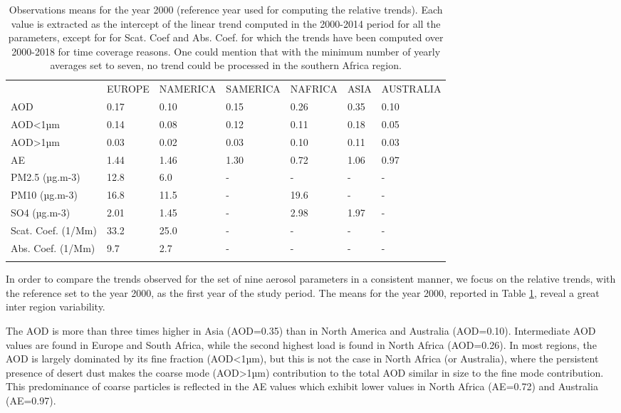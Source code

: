 \documentclass[journal abbreviation, manuscript]{copernicus}
\begin{document}
\begin{table}
 \begin{tabular}{lllllll}
  \tophline
                     & EUROPE & NAMERICA & SAMERICA & NAFRICA & ASIA & AUSTRALIA \\
  \middlehline
  AOD                & 0.17   & 0.10     & 0.15     & 0.26    & 0.35 & 0.10      \\
  AOD<1µm            & 0.14   & 0.08     & 0.12     & 0.11    & 0.18 & 0.05      \\
  AOD>1µm            & 0.03   & 0.02     & 0.03     & 0.10    & 0.11 & 0.03      \\
  AE                 & 1.44   & 1.46     & 1.30     & 0.72    & 1.06 & 0.97      \\
  PM2.5 (µg.m-3)     & 12.8   & 6.0      & -        & -       & -    & -         \\
  PM10 (µg.m-3)      & 16.8   & 11.5     & -        & 19.6    & -    & -         \\
  SO4 (µg.m-3)       & 2.01   & 1.45     & -        & 2.98    & 1.97 & -         \\
  Scat. Coef. (1/Mm) & 33.2   & 25.0     & -        & -       & -    & -         \\
  Abs. Coef. (1/Mm)  & 9.7    & 2.7      & -        & -       & -    & -         \\
  \bottomhline
 \end{tabular}

 \caption{Observations means for the year 2000 (reference year used for computing the relative trends). Each value is extracted as the intercept of the linear trend computed in the 2000-2014 period for all the parameters, except for for Scat. Coef and Abs. Coef. for which the trends have been computed over 2000-2018 for time coverage reasons. One could mention that with the minimum number of yearly averages set to seven, no trend could be processed in the southern Africa region.}
 \label{table:obs_2000mean}
\end{table}

In order to compare the trends observed for the set of nine aerosol parameters in a consistent manner, we focus on the relative trends, with the reference set to the year 2000, as the first year of the study period. The means for the year 2000, reported in Table \ref{table:obs_2000mean}, reveal a great inter region variability.

The AOD is more than three times higher in Asia (AOD=0.35) than in North America and Australia (AOD=0.10). Intermediate AOD values are found in Europe and South Africa, while the second highest load is found in North Africa (AOD=0.26). In most regions, the AOD is largely dominated by its fine fraction (AOD<1µm), but this is not the case in North Africa (or Australia), where the persistent presence of desert dust makes the coarse mode (AOD>1µm) contribution to the total AOD similar in size to the fine mode contribution. This predominance of coarse particles is reflected in the AE values which exhibit lower values in North Africa (AE=0.72) and Australia (AE=0.97).
\end{document}
